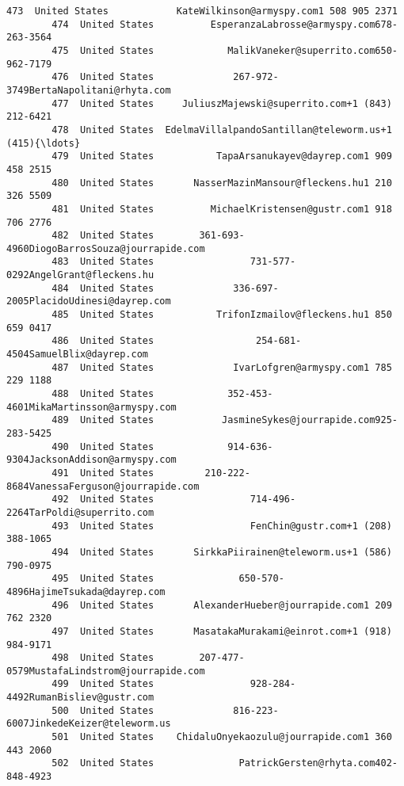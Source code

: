 \documentclass[11pt]{article}
\begin{document}
\begin{Verbatim}[commandchars=\\\{\}]
        473  United States            KateWilkinson@armyspy.com1 508 905 2371   
        474  United States          EsperanzaLabrosse@armyspy.com678-263-3564   
        475  United States             MalikVaneker@superrito.com650-962-7179   
        476  United States              267-972-3749BertaNapolitani@rhyta.com   
        477  United States     JuliuszMajewski@superrito.com+1 (843) 212-6421   
        478  United States  EdelmaVillalpandoSantillan@teleworm.us+1 (415){\ldots}   
        479  United States           TapaArsanukayev@dayrep.com1 909 458 2515   
        480  United States       NasserMazinMansour@fleckens.hu1 210 326 5509   
        481  United States          MichaelKristensen@gustr.com1 918 706 2776   
        482  United States        361-693-4960DiogoBarrosSouza@jourrapide.com   
        483  United States                 731-577-0292AngelGrant@fleckens.hu   
        484  United States              336-697-2005PlacidoUdinesi@dayrep.com   
        485  United States           TrifonIzmailov@fleckens.hu1 850 659 0417   
        486  United States                  254-681-4504SamuelBlix@dayrep.com   
        487  United States              IvarLofgren@armyspy.com1 785 229 1188   
        488  United States             352-453-4601MikaMartinsson@armyspy.com   
        489  United States            JasmineSykes@jourrapide.com925-283-5425   
        490  United States             914-636-9304JacksonAddison@armyspy.com   
        491  United States         210-222-8684VanessaFerguson@jourrapide.com   
        492  United States                 714-496-2264TarPoldi@superrito.com   
        493  United States                 FenChin@gustr.com+1 (208) 388-1065   
        494  United States       SirkkaPiirainen@teleworm.us+1 (586) 790-0975   
        495  United States               650-570-4896HajimeTsukada@dayrep.com   
        496  United States       AlexanderHueber@jourrapide.com1 209 762 2320   
        497  United States       MasatakaMurakami@einrot.com+1 (918) 984-9171   
        498  United States        207-477-0579MustafaLindstrom@jourrapide.com   
        499  United States                 928-284-4492RumanBisliev@gustr.com   
        500  United States              816-223-6007JinkedeKeizer@teleworm.us   
        501  United States    ChidaluOnyekaozulu@jourrapide.com1 360 443 2060   
        502  United States               PatrickGersten@rhyta.com402-848-4923   
        

\end{Verbatim}
\end{document}
